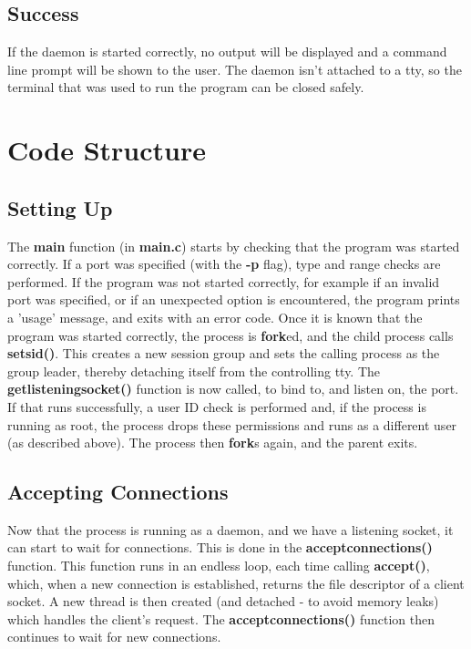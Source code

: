 \documentclass[a4paper]{article}
\begin{document}
\subsection{Success}
If the daemon is started correctly, no output will be displayed and a command
line prompt will be shown to the user. The daemon isn't attached to a tty, so
the terminal that was used to run the program can be closed safely.

\section{Code Structure}

\subsection{Setting Up}
The {\bf main} function (in {\bf main.c}) starts by checking that the
program was started correctly. If a port was specified (with the {\bf -p}
flag), type and range checks are performed. If the program was not started
correctly, for example if an invalid port was specified, or if an unexpected
option is encountered, the program prints a 'usage' message, and exits with an
error code. Once it is known that the program was started correctly, the process
is {\bf fork}ed, and the child process calls {\bf setsid()}. This creates
a new session group and sets the calling process as the group leader, thereby
detaching itself from the controlling tty. The {\bf getlisteningsocket()}
function is now called, to bind to, and listen on, the port. If that runs
successfully, a user ID check is performed and, if the process is running as
root, the process drops these permissions and runs as a different user (as
described above). The process then {\bf fork}s again, and the parent exits.

\subsection{Accepting Connections}
Now that the process is running as a daemon, and we have a listening socket, it
can start to wait for connections. This is done in the
{\bf acceptconnections()} function. This function runs in an endless loop,
each time calling {\bf accept()}, which, when a new connection is
established, returns the file descriptor of a client socket. A new thread is
then created (and detached - to avoid memory leaks) which handles the client's
request. The {\bf acceptconnections()} function then continues to wait for
new connections.
\end{document}
